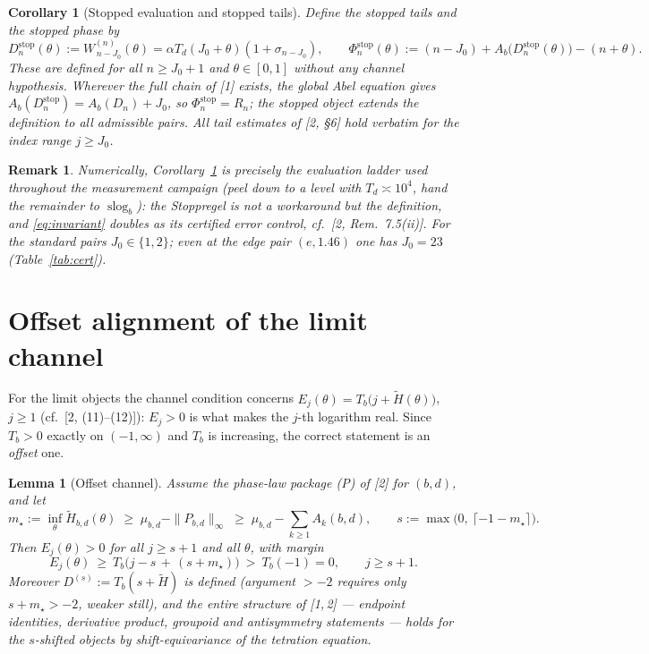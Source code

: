 \documentclass[11pt]{article}
\newtheorem{lemma}[theorem]{Lemma}
\newtheorem{corollary}[theorem]{Corollary}
\newtheorem{remark}[theorem]{Remark}
\begin{document}
\begin{corollary}[Stopped evaluation and stopped tails]\label{cor:stopped}
Define the stopped tails and the stopped phase by
\[
D_n^{\mathrm{stop}}(\theta):=W_{\,n-J_0}^{(n)}(\theta)
=\alpha T_d(J_0+\theta)(1+\sigma_{n-J_0}),
\qquad
\Phi^{\mathrm{stop}}_n(\theta):=(n-J_0)+A_b\bigl(D_n^{\mathrm{stop}}(\theta)\bigr)-(n+\theta).
\]
These are defined for all $n\ge J_0+1$ and $\theta\in[0,1]$ without any
channel hypothesis.  Wherever the full chain of {\rm[1]} exists, the global
Abel equation gives $A_b(D_n^{\mathrm{stop}})=A_b(D_n)+J_0$, so
$\Phi^{\mathrm{stop}}_n=R_n$; the stopped object extends the definition to all
admissible pairs.  All tail estimates of {\rm[2, \S6]} hold verbatim for the
index range $j\ge J_0$.
\end{corollary}

\begin{remark}
Numerically, Corollary~\ref{cor:stopped} is precisely the evaluation ladder
used throughout the measurement campaign (peel down to a level with
$T_d\asymp10^{4}$, hand the remainder to $\operatorname{slog}_b$): the
Stoppregel is not a workaround but \emph{the} definition, and
\eqref{eq:invariant} doubles as its certified error control, cf.\
[2, Rem.~7.5(ii)].  For the standard pairs $J_0\in\{1,2\}$; even at the edge
pair $(e,1.46)$ one has $J_0=23$ (Table~\ref{tab:cert}).
\end{remark}

\section{Offset alignment of the limit channel}\label{sec:offset}

For the limit objects the channel condition concerns
$E_j(\theta)=T_b\bigl(j+\widetilde H(\theta)\bigr)$, $j\ge1$
(cf.\ [2, (11)--(12)]): $E_j>0$ is what makes the $j$-th logarithm real.
Since $T_b>0$ exactly on $(-1,\infty)$ and $T_b$ is increasing, the correct
statement is an \emph{offset} one.

\begin{lemma}[Offset channel]\label{lem:offset}
Assume the phase-law package {\rm(P)} of {\rm[2]} for $(b,d)$, and let
\[
m_\star:=\inf_{\theta}\widetilde H_{b,d}(\theta)\;\ge\;\mu_{b,d}-\|P_{b,d}\|_\infty
\;\ge\;\mu_{b,d}-\sum_{k\ge1}A_k(b,d),
\qquad
s:=\max\bigl(0,\ \lceil -1-m_\star\rceil\bigr).
\]
Then $E_j(\theta)>0$ for all $j\ge s+1$ and all $\theta$, with margin
\[
E_j(\theta)\ \ge\ T_b\bigl(j-s\,+\,(s+m_\star)\bigr)\ >\ T_b(-1)=0,
\qquad j\ge s+1 .
\]
Moreover $D^{(s)}:=T_b(s+\widetilde H)$ is defined (argument $>-2$ requires
only $s+m_\star>-2$, weaker still), and the entire structure of
{\rm[1,\,2]} --- endpoint identities, derivative product, groupoid and
antisymmetry statements --- holds for the $s$-shifted objects by
shift-equivariance of the tetration equation.
\end{lemma}
\end{document}
